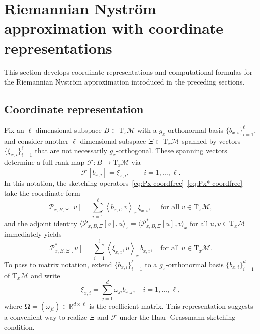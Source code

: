 \documentclass[final,onefignum,onetabnum]{siamart250211}
\begin{document}
\section{Riemannian Nystr\"om approximation with coordinate representations}
\label{sec:computations}

This section develops coordinate representations and computational formulas for the Riemannian Nystr\"om approximation introduced in the preceding sections.

\subsection{Coordinate representation}

Fix an $\ell$-dimensional subspace $B\subset \mathrm T_x\mathcal M$ with a $g_x$-orthonormal basis $\{b_{x,i}\}_{i=1}^\ell$, and consider another $\ell$-dimensional subspace $\Xi \subset \mathrm T_x\mathcal M$ spanned by vectors $\{\xi_{x,i}\}_{i=1}^\ell$ that are not necessarily $g_x$-orthogonal.
These spanning vectors determine a full-rank map $\mathcal F:B\to\mathrm T_x\mathcal M$ via
\[
  \mathcal F[b_{x,i}]=\xi_{x,i}, \qquad i=1,\dots,\ell.
\]
In this notation, the sketching operators~\eqref{eq:Px-coordfree}--\eqref{eq:Px*-coordfree} take the coordinate form
\begin{equation}
  \label{eq: Px}
\mathcal{P}_{x, B, \Xi}[v]=\sum_{i =1}^{\ell}\left\langle b_{x, i}, v\right\rangle_{x} \, \xi_{x, i},\quad \text{ for all } v \in \mathrm T_{x} \mathcal{M},
\end{equation}
and the adjoint identity
$
  \langle\mathcal{P}_{x, B, \Xi}[v], u\rangle_{x}=\langle\mathcal{P}_{x, B, \Xi}^{*}[u], v\rangle_{x}
$
for all $u,v\in \mathrm T_{x} \mathcal{M}$ immediately yields
\begin{equation}
  \label{eq: Px*}
\mathcal{P}_{x, B, \Xi}^{*}[u]=\sum_{i =1}^{\ell}\left\langle \xi_{x, i}, u\right\rangle_{x} \, b_{x, i},\quad  \text{for all } u \in \mathrm T_{x} \mathcal{M}.
\end{equation}
To pass to matrix notation, extend $\{b_{x,i}\}_{i=1}^\ell$ to a $g_x$-orthonormal basis $\{b_{x,i}\}_{i=1}^d$ of $\mathrm T_x\mathcal M$ and write
\begin{equation}
  \label{eq: pxi}
  \xi_{x, i}=\sum_{j=1}^d \omega_{ji}b_{x, j}, \quad i =1,\dots,\ell,
\end{equation}
where $\mathbf{\Omega}=(\omega_{ji})\in\mathbb R^{d\times\ell}$ is the coefficient matrix.
This representation suggests a convenient way to realize $\Xi$ and $\mathcal F$ under the Haar--Grassmann sketching condition.
\end{document}
